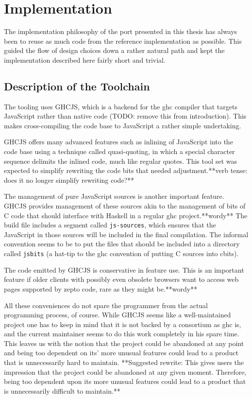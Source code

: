 \documentclass[oneside,11pt,xetex]{scrbook}
\begin{document}
\chapter{Implementation}
\label{chap:Implementation}

The implementation  philosophy of the port presented in this thesis has always been to
reuse as much code from the reference implementation as possible. This guided the flow of design
choices down a rather natural path and kept the implementation described here fairly short and trivial.

\section{Description of the Toolchain}

The tooling uses GHCJS, which is a backend for the \gls{ghc} compiler that targets JavaScript rather
than native code (TODO: remove this from introduction). This makes cross-compiling the code base to
JavaScript a rather simple undertaking.

GHCJS offers many advanced features such as inlining of JavaScript into the code
base using a technique called quasi-quoting, in which a special character sequence delimits the
inlined code, much like regular quotes. This tool set was expected to simplify rewriting the code
bits that needed adjustment.**verb tense: does it no longer simplify rewriting code?**

The management of pure JavaScript sources is another important feature. GHCJS provides management
of these sources akin to the management of bits of C code that should interface with Haskell in a
regular \gls{ghc} project.**wordy** The build file includes a segment called \texttt{js-sources}, which ensures
that the JavaScript in those sources will be included in the final compilation. The informal convention
seems to be to put the files that should be included into a directory called \texttt{jsbits} (a hat-tip
to the \gls{ghc} convention of putting C sources into cbits).

The code emitted by GHCJS is conservative in feature use. This is an important feature if older clients
with possibly even obsolete browsers want to access web pages supported by zepto code, rare as they might
be.**wordy**

All these conveniences do not spare the programmer from the actual programming process, of course.
While GHCJS seems like a well-maintained project one has to keep in mind that it is not backed
by a consortium as \gls{ghc} is, and the current maintainer seems to do this work completely
in his spare time. This leaves us with the notion that the project could be abandoned at any point
and being too dependent on its' more unusual features could lead to a product that is unnecessarily
hard to maintain. **Suggested rewrite: This gives users the impression that the project could be abandoned at any given moment. Therefore, being too dependent upon its more unusual features could lead to a product that is unnecessarily difficult to maintain.**
\end{document}
